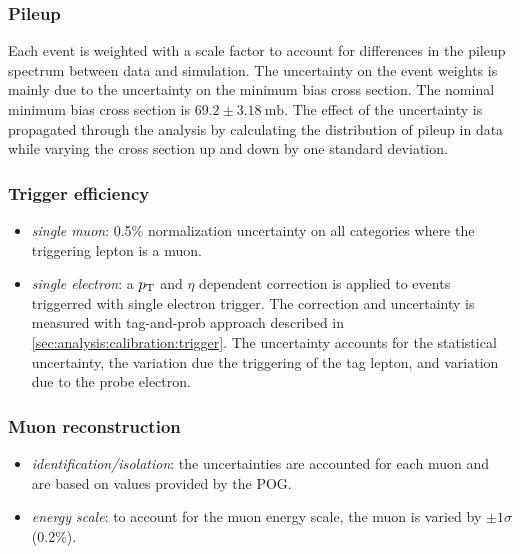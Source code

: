 \subsubsection{Pileup}

Each event is weighted with a scale factor to account for differences in the pileup spectrum between data and simulation.  The uncertainty on the event weights is mainly due to the uncertainty on the minimum bias cross section.  The nominal minimum bias cross section is $69.2 \pm 3.18~\text{mb}$. The effect of the uncertainty is propagated through the analysis by calculating the distribution of pileup in data while varying the cross section up and down by one standard deviation.  

\subsubsection{Trigger efficiency}


\begin{itemize}
    \item \textit{single muon}: 0.5\% normalization uncertainty on all categories where the triggering lepton is a muon.
    \item \textit{single electron}: a $p_{\mathrm{T}}$ and $\eta$ dependent correction is applied to events triggerred with single electron trigger. The correction and uncertainty is measured with tag-and-prob approach described in \ref{sec:analysis:calibration:trigger}. The uncertainty accounts for the statistical uncertainty, the variation due the triggering of the tag lepton, and variation due to the probe electron.
\end{itemize}

\subsubsection{Muon reconstruction}
    \begin{itemize}
    \item \textit{identification/isolation}: the uncertainties are accounted for each muon and are based on values provided by the POG. 
    \item \textit{energy scale}: to account for the muon energy scale, the muon \pt is varied by $\pm 1 \sigma$ (0.2\%).
    \end{itemize}

